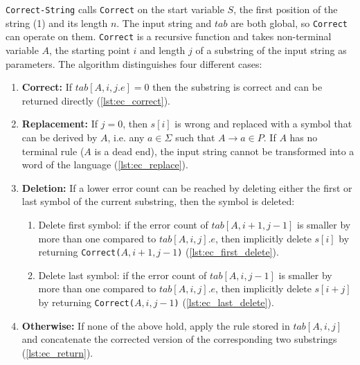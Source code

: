 \texttt{Correct-String} calls \texttt{Correct} on the start variable $S$, the first position of the string (1) and its length $n$.
The input string and $tab$ are both global, so \texttt{Correct} can operate on them.
\texttt{Correct} is a recursive function and takes non-terminal variable $A$, the starting point $i$ and length $j$ of a substring of the input string as parameters. 
The algorithm distinguishes four different cases:
\begin{enumerate}
    \item \textbf{Correct:} If $tab[A,i,j.e]=0$ then the substring is correct and can be returned directly (\cref{lst:ec_correct}).
    \item \textbf{Replacement:} If $j=0$, then $s[i]$ is wrong and replaced with a symbol that can be derived by $A$, i.e. any $a\in \Sigma$ such that $A\rightarrow a \in P$. If $A$ has no terminal rule ($A$ is a dead end), the input string cannot be transformed into a word of the language (\cref{lst:ec_replace}).
    \item \textbf{Deletion:} If a lower error count can be reached by deleting either the first or last symbol of the current substring, then the symbol is deleted:
        \begin{enumerate}[label=\alph*)]
            \item Delete first symbol: if the error count of $tab[A,i+1,j-1]$ is smaller by more than one compared to $tab[A,i,j].e$, then implicitly delete $s[i]$ by returning \texttt{Correct($A, i+1, j-1$)} (\cref{lst:ec_first_delete}).
            \item Delete last symbol: if the error count of $tab[A,i,j-1]$ is smaller by more than one compared to $tab[A,i,j].e$, then implicitly delete $s[i+j]$ by returning \texttt{Correct($A, i, j-1$)} (\cref{lst:ec_last_delete}).
        \end{enumerate}

    \item \textbf{Otherwise:} If none of the above hold, apply the rule stored in $tab[A,i,j]$ and concatenate the corrected version of the corresponding two substrings (\cref{lst:ec_return}).
\end{enumerate} 

